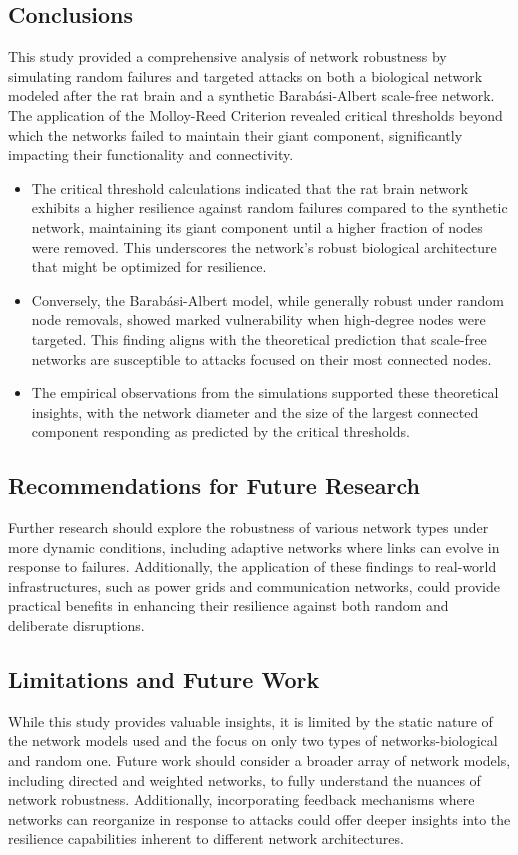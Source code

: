 \documentclass[
	report, %
	11pt, %
]{CSUniSchoolLabReport}
\newcounter{ct}
\begin{document}
\subsection{Conclusions}
This study provided a comprehensive analysis of network robustness by simulating random failures and targeted attacks on both a biological network modeled after the rat brain and a synthetic Barabási-Albert scale-free network. The application of the Molloy-Reed Criterion revealed critical thresholds beyond which the networks failed to maintain their giant component, significantly impacting their functionality and connectivity.\par
\begin{itemize}
    \item The critical threshold calculations indicated that the rat brain network exhibits a higher resilience against random failures compared to the synthetic network, maintaining its giant component until a higher fraction of nodes were removed. This underscores the network's robust biological architecture that might be optimized for resilience.
    \item Conversely, the Barabási-Albert model, while generally robust under random node removals, showed marked vulnerability when high-degree nodes were targeted. This finding aligns with the theoretical prediction that scale-free networks are susceptible to attacks focused on their most connected nodes.
    \item The empirical observations from the simulations supported these theoretical insights, with the network diameter and the size of the largest connected component responding as predicted by the critical thresholds.
\end{itemize}

\subsection{Recommendations for Future Research}
Further research should explore the robustness of various network types under more dynamic conditions, including adaptive networks where links can evolve in response to failures. Additionally, the application of these findings to real-world infrastructures, such as power grids and communication networks, could provide practical benefits in enhancing their resilience against both random and deliberate disruptions.

\subsection{Limitations and Future Work}
While this study provides valuable insights, it is limited by the static nature of the network models used and the focus on only two types of networks-biological and random one. Future work should consider a broader array of network models, including directed and weighted networks, to fully understand the nuances of network robustness. Additionally, incorporating feedback mechanisms where networks can reorganize in response to attacks could offer deeper insights into the resilience capabilities inherent to different network architectures.
\end{document}
